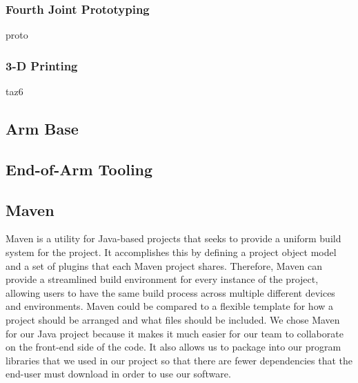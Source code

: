 \subsubsection{Fourth Joint Prototyping}
proto

\subsubsection{3-D Printing}
taz6

\subsection{Arm Base}

\subsection{End-of-Arm Tooling}

\subsection{Maven}
Maven is a utility for Java-based projects that seeks to provide a uniform build system for the project. It accomplishes this by defining a project object model and a set of plugins that each Maven project shares. Therefore, Maven can provide a streamlined build environment for every instance of the project, allowing users to have the same build process across multiple different devices and environments. Maven could be compared to a flexible template for how a project should be arranged and what files should be included. We chose Maven for our Java project because it makes it much easier for our team to collaborate on the front-end side of the code.  It also allows us to package into our program libraries that we used in our project so that there are fewer dependencies that the end-user must download in order to use our software.







